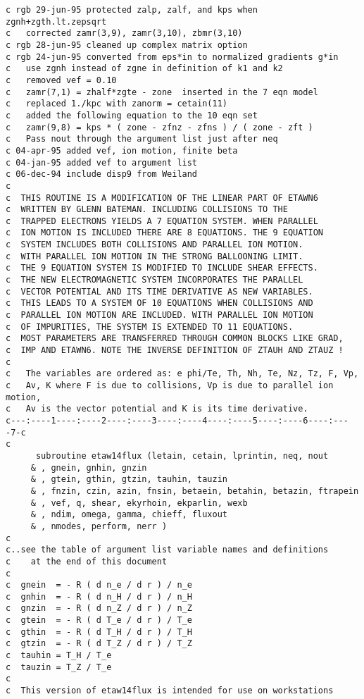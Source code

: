 \begin{verbatim}
c rgb 29-jun-95 protected zalp, zalf, and kps when zgnh+zgth.lt.zepsqrt
c   corrected zamr(3,9), zamr(3,10), zbmr(3,10)
c rgb 28-jun-95 cleaned up complex matrix option
c rgb 24-jun-95 converted from eps*in to normalized gradients g*in
c   use zgnh instead of zgne in definition of k1 and k2
c   removed vef = 0.10
c   zamr(7,1) = zhalf*zgte - zone  inserted in the 7 eqn model
c   replaced 1./kpc with zanorm = cetain(11)
c   added the following equation to the 10 eqn set
c   zamr(9,8) = kps * ( zone - zfnz - zfns ) / ( zone - zft )
c   Pass nout through the argument list just after neq
c 04-apr-95 added vef, ion motion, finite beta
c 04-jan-95 added vef to argument list
c 06-dec-94 include disp9 from Weiland
c
c  THIS ROUTINE IS A MODIFICATION OF THE LINEAR PART OF ETAWN6
c  WRITTEN BY GLENN BATEMAN. INCLUDING COLLISIONS TO THE
c  TRAPPED ELECTRONS YIELDS A 7 EQUATION SYSTEM. WHEN PARALLEL
c  ION MOTION IS INCLUDED THERE ARE 8 EQUATIONS. THE 9 EQUATION
c  SYSTEM INCLUDES BOTH COLLISIONS AND PARALLEL ION MOTION.
c  WITH PARALLEL ION MOTION IN THE STRONG BALLOONING LIMIT.
c  THE 9 EQUATION SYSTEM IS MODIFIED TO INCLUDE SHEAR EFFECTS.
c  THE NEW ELECTROMAGNETIC SYSTEM INCORPORATES THE PARALLEL
c  VECTOR POTENTIAL AND ITS TIME DERIVATIVE AS NEW VARIABLES.
c  THIS LEADS TO A SYSTEM OF 10 EQUATIONS WHEN COLLISIONS AND
c  PARALLEL ION MOTION ARE INCLUDED. WITH PARALLEL ION MOTION
c  OF IMPURITIES, THE SYSTEM IS EXTENDED TO 11 EQUATIONS.
c  MOST PARAMETERS ARE TRANSFERRED THROUGH COMMON BLOCKS LIKE GRAD,
c  IMP AND ETAWN6. NOTE THE INVERSE DEFINITION OF ZTAUH AND ZTAUZ !
c
c   The variables are ordered as: e phi/Te, Th, Nh, Te, Nz, Tz, F, Vp, 
c   Av, K where F is due to collisions, Vp is due to parallel ion motion,
c   Av is the vector potential and K is its time derivative.
c---:----1----:----2----:----3----:----4----:----5----:----6----:----7-c
c
      subroutine etaw14flux (letain, cetain, lprintin, neq, nout
     & , gnein, gnhin, gnzin
     & , gtein, gthin, gtzin, tauhin, tauzin
     & , fnzin, czin, azin, fnsin, betaein, betahin, betazin, ftrapein
     & , vef, q, shear, ekyrhoin, ekparlin, wexb
     & , ndim, omega, gamma, chieff, fluxout
     & , nmodes, perform, nerr )
c
c..see the table of argument list variable names and definitions
c    at the end of this document
c
c  gnein  = - R ( d n_e / d r ) / n_e
c  gnhin  = - R ( d n_H / d r ) / n_H
c  gnzin  = - R ( d n_Z / d r ) / n_Z
c  gtein  = - R ( d T_e / d r ) / T_e
c  gthin  = - R ( d T_H / d r ) / T_H
c  gtzin  = - R ( d T_Z / d r ) / T_Z
c  tauhin = T_H / T_e
c  tauzin = T_Z / T_e
c
c  This version of etaw14flux is intended for use on workstations

\end{verbatim}
